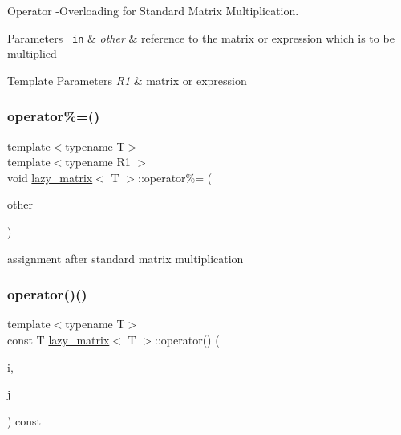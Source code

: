 Operator -\/Overloading for Standard Matrix Multiplication. 


\begin{DoxyParams}[1]{Parameters}
\mbox{\texttt{ in}}  & {\em other} & reference to the matrix or expression which is to be multiplied\\
\hline
\end{DoxyParams}

\begin{DoxyTemplParams}{Template Parameters}
{\em R1} & matrix or expression \\
\hline
\end{DoxyTemplParams}
\mbox{\label{classlazy__matrix_a6bf0976366215515282bea034b863489}} 
\subsubsection{\texorpdfstring{operator\%=()}{operator\%=()}}
{\footnotesize\ttfamily template$<$typename T$>$ \\
template$<$typename R1 $>$ \\
void \mbox{\hyperlink{classlazy__matrix}{lazy\+\_\+matrix}}$<$ T $>$\+::operator\%= (\begin{DoxyParamCaption}\item[{const R1 \&}]{other }\end{DoxyParamCaption})\hspace{0.3cm}{\ttfamily [inline]}}



assignment after standard matrix multiplication 

\mbox{\label{classlazy__matrix_a6d81b29ae59ada2332c1b16a889e3350}} 
\subsubsection{\texorpdfstring{operator()()}{operator()()}\hspace{0.1cm}{\footnotesize\ttfamily [1/2]}}
{\footnotesize\ttfamily template$<$typename T$>$ \\
const T \mbox{\hyperlink{classlazy__matrix}{lazy\+\_\+matrix}}$<$ T $>$\+::operator() (\begin{DoxyParamCaption}\item[{const std\+::size\+\_\+t}]{i,  }\item[{const std\+::size\+\_\+t}]{j }\end{DoxyParamCaption}) const\hspace{0.3cm}{\ttfamily [inline]}}

